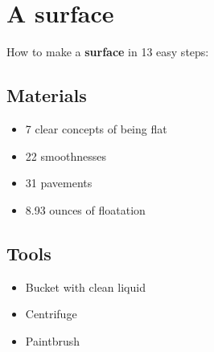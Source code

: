 \documentclass{article}
\begin{document}
\section{A surface}How to make a \textbf{surface} in 13 easy steps:

\subsection{Materials}\begin{itemize}
\item 
7 clear concepts of being flat
\item 
22 smoothnesses
\item 
31 pavements
\item 
8.93 ounces of floatation
\end{itemize}
\subsection{Tools}\begin{itemize}
\item 
Bucket with clean liquid
\item 
Centrifuge
\item 
Paintbrush
\end{itemize}
\end{document}
